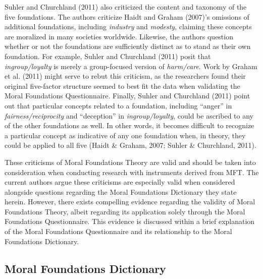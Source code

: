 \documentclass[english,,man]{apa6}
\begin{document}
Suhler and Churchland (2011) also criticized the content and taxonomy of the five foundations. The authors criticize Haidt and Graham (2007)'s omissions of additional foundations, including \emph{industry} and \emph{modesty}, claiming these concepts are moralized in many societies worldwide. Likewise, the authors question whether or not the foundations are sufficiently distinct as to stand as their own foundation. For example, Suhler and Churchland (2011) posit that \emph{ingroup/loyalty} is merely a group-focused version of \emph{harm/care}. Work by Graham et al. (2011) might serve to rebut this criticism, as the researchers found their original five-factor structure seemed to best fit the data when validating the Moral Foundations Questionnaire. Finally, Suhler and Churchland (2011) point out that particular concepts related to a foundation, including \enquote{anger} in \emph{fairness/reciprocity} and \enquote{deception} in \emph{ingroup/loyalty}, could be ascribed to any of the other foundations as well. In other words, it becomes difficult to recognize a particular concept as indicative of any one foundation when, in theory, they could be applied to all five (Haidt \& Graham, 2007; Suhler \& Churchland, 2011).

These criticisms of Moral Foundations Theory are valid and should be taken into consideration when conducting research with instruments derived from MFT. The current authors argue these criticisms are especially valid when considered alongside questions regarding the Moral Foundations Dictionary they state herein. However, there exists compelling evidence regarding the validity of Moral Foundations Theory, albeit regarding its application solely through the Moral Foundations Questionnaire. This evidence is discussed within a brief explanation of the Moral Foundations Questionnaire and its relationship to the Moral Foundations Dictionary.

\hypertarget{moral-foundations-dictionary}{%
\subsection{Moral Foundations Dictionary}\label{moral-foundations-dictionary}}
\end{document}
